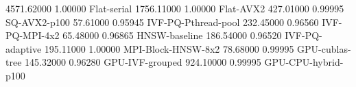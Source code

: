 4571.62000 1.00000 {Flat-serial}
1756.11000 1.00000 {Flat-AVX2}
427.01000 0.99995 {SQ-AVX2-p100}
57.61000 0.95945 {IVF-PQ-Pthread-pool}
232.45000 0.96560 {IVF-PQ-MPI-4x2}
65.48000 0.96865 {HNSW-baseline}
186.54000 0.96520 {IVF-PQ-adaptive}
195.11000 1.00000 {MPI-Block-HNSW-8x2}
78.68000 0.99995 {GPU-cublas-tree}
145.32000 0.96280 {GPU-IVF-grouped}
924.10000 0.99995 {GPU-CPU-hybrid-p100}
